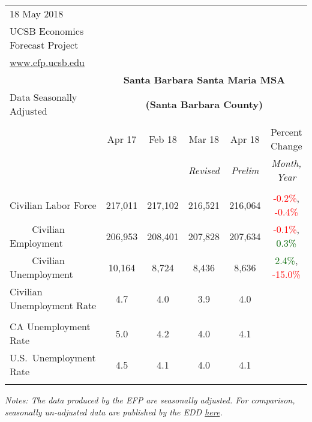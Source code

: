 \documentclass[12pt]{article}
\begin{document}
\begin{table}
\begin{tabular}{|l|c|c|c|c|c|}
\multicolumn{1}{l}{\small 18 May 2018} & \multicolumn{5}{c}{} \\
\multicolumn{1}{l}{\small UCSB Economics Forecast Project} & \multicolumn{5}{c}{} \\
\multicolumn{1}{l}{\small \href{http://www.efp.ucsb.edu/}{www.efp.ucsb.edu}} & \multicolumn{5}{c}{} \\
\multicolumn{1}{c}{} & \multicolumn{5}{c}{\large \textbf{Santa Barbara Santa Maria MSA}} \\
\multicolumn{1}{l}{\small Data Seasonally Adjusted} & \multicolumn{5}{c}{\small \textbf{(Santa Barbara County)}} \\ \hline \hline
& & & & & \\
 & Apr 17 & Feb 18 & Mar 18 & Apr 18 & Percent Change \\
 & & & \small \textit{Revised} & \small \textit{Prelim} & \small \textit{Month, Year} \\ \hline
& & & & & \\
Civilian Labor Force & 217,011 & 217,102 & 216,521 & 216,064 & \textcolor{red}{-0.2\%}, \textcolor{red}{-0.4\%} \\
$\qquad$ \small Civilian Employment & 206,953 & 208,401 & 207,828 & 207,634 & \textcolor{red}{-0.1\%}, \textcolor{darkgreen}{0.3\%} \\
$\qquad$ \small Civilian Unemployment & 10,164 & 8,724 & 8,436 & 8,636 & \textcolor{darkgreen}{2.4\%}, \textcolor{red}{-15.0\%} \\
Civilian Unemployment Rate & 4.7 & 4.0 & 3.9 & 4.0 & \\
& & & & & \\
CA Unemployment Rate & 5.0 & 4.2 & 4.0 & 4.1 & \\
U.S.\ Unemployment Rate & 4.5 & 4.1 & 4.0 & 4.1 & \\
& & & & & \\ \hline \hline
\end{tabular}
\par
\vspace{.5em}
\footnotesize
\textit{Notes: The data produced by the EFP are seasonally adjusted. For comparison, seasonally un-adjusted data are published by the EDD \href{http://www.labormarketinfo.ca.gov/file/lfmonth/satb$pds.pdf}{here}.}
\end{table}
\end{document}
